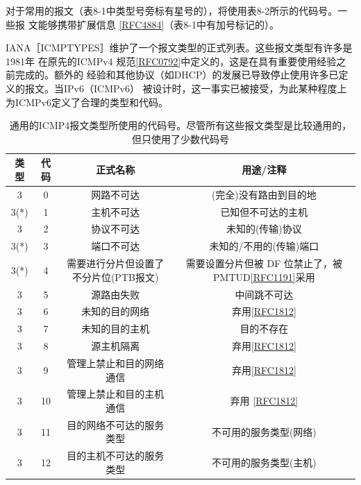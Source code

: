 对于常用的报文（表8-1中类型号旁标有星号的），将使用表8-2所示的代码号。一些报
文能够携带扩展信息 \href{https://www.rfc-editor.org/rfc/rfc4884}{[RFC4884]}（表8-1中有加号标记的）。

IANA［ICMPTYPES］维护了一个报文类型的正式列表。这些报文类型有许多是1981年
在原先的ICMPv4
规范\href{https://www.rfc-editor.org/rfc/rfc0792}{[RFC0792]}中定义的，这是在具有重要使用经验之前完成的。额外的
经验和其他协议（如DHCP）的发展已导致停止使用许多已定义的报文。当IPv6（ICMPv6）
被设计时，这一事实已被接受，为此某种程度上为ICMPv6定义了合理的类型和代码。

\begin{table}[H]
  \scriptsize
  \centering
  \caption{通用的ICMP4报文类型所使用的代码号。尽管所有这些报文类型是比较通用的，但只使用了少数代码号}
  \begin{tabular}{c|c|c|c}
    \hline
    类型  &  代码  &  正式名称  & 用途/注释  \\ \hline
    3    &  0  &  网路不可达  &  (完全)没有路由到目的地 \\ \hline
    3(*)  &  1  &  主机不可达  &  已知但不可达的主机 \\ \hline
    3    &  2  &  协议不可达  &  未知的(传输)协议 \\ \hline
    3(*)  &  3  &  端口不可达  &  未知的/不用的(传输)端口 \\ \hline
    3(*)  &  4  &  需要进行分片但设置了不分片位(PTB报文)  &  需要设置分片但被 DF 位禁止了，被
    PMTUD\href{https://www.rfc-editor.org/rfc/rfc1191}{[RFC1191]}采用 \\ \hline
    3    &  5  &  源路由失败  &  中间跳不可达 \\ \hline
    3    &  6  &  未知的目的网络  &
    弃用\href{https://www.rfc-editor.org/rfc/rfc1812}{[RFC1812]} \\ \hline
    3    &  7  &  未知的目的主机  &  目的不存在 \\ \hline
    3    &  8  &  源主机隔离  &
    弃用\href{https://www.rfc-editor.org/rfc/rfc1812}{[RFC1812]} \\ \hline
    3    &  9  &  管理上禁止和目的网络通信  &
    弃用\href{https://www.rfc-editor.org/rfc/rfc1812}{[RFC1812]} \\ \hline
    3    &  10  &  管理上禁止和目的主机通信  &  弃用
    \href{https://www.rfc-editor.org/rfc/rfc1812}{[RFC1812]} \\ \hline
    3    &  11  &  目的网络不可达的服务类型  &  不可用的服务类型(网络) \\ \hline
    3    &  12  &  目的主机不可达的服务类型  &  不可用的服务类型(主机) \\ \hline

\end{tabular}
\end{table}

